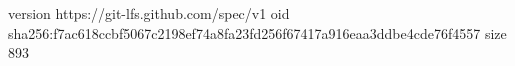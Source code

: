 version https://git-lfs.github.com/spec/v1
oid sha256:f7ac618ccbf5067c2198ef74a8fa23fd256f67417a916eaa3ddbe4cde76f4557
size 893
